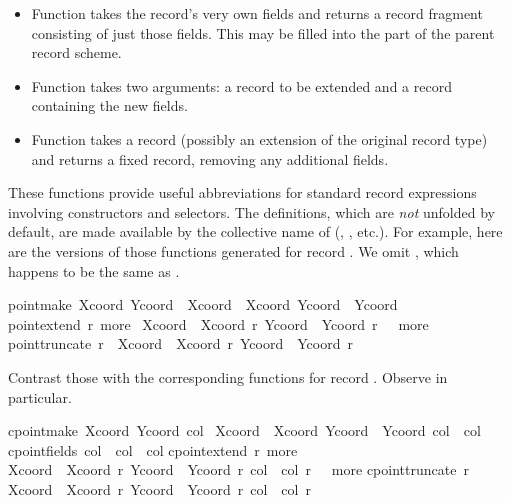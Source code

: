 \begin{isabellebody}
\begin{isamarkuptext}
\begin{itemize}
  \item Function  takes the record's very own fields and
  returns a record fragment consisting of just those fields.  This may
  be filled into the  part of the parent record scheme.

  \item Function  takes two arguments: a record to be
  extended and a record containing the new fields.

  \item Function  takes a record (possibly an extension
  of the original record type) and returns a fixed record, removing
  any additional fields.

  \end{itemize}
  These functions provide useful abbreviations for standard
  record expressions involving constructors and selectors.  The
  definitions, which are \emph{not} unfolded by default, are made
  available by the collective name of  (, , etc.).
  For example, here are the versions of those functions generated for
  record .  We omit , which happens to
  be the same as .

  \begin{isabelle}%
point{\isachardot}make\ Xcoord\ Ycoord\ {\isasymequiv}\ {\isasymlparr}Xcoord\ {\isacharequal}\ Xcoord{\isacharcomma}\ Ycoord\ {\isacharequal}\ Ycoord{\isasymrparr}\isasep\isanewline%
point{\isachardot}extend\ r\ more\ {\isasymequiv}\isanewline
{\isasymlparr}Xcoord\ {\isacharequal}\ Xcoord\ r{\isacharcomma}\ Ycoord\ {\isacharequal}\ Ycoord\ r{\isacharcomma}\ {\isasymdots}\ {\isacharequal}\ more{\isasymrparr}\isasep\isanewline%
point{\isachardot}truncate\ r\ {\isasymequiv}\ {\isasymlparr}Xcoord\ {\isacharequal}\ Xcoord\ r{\isacharcomma}\ Ycoord\ {\isacharequal}\ Ycoord\ r{\isasymrparr}%
\end{isabelle}
  Contrast those with the corresponding functions for record .  Observe  in particular.
  \begin{isabelle}%
cpoint{\isachardot}make\ Xcoord\ Ycoord\ col\ {\isasymequiv}\isanewline
{\isasymlparr}Xcoord\ {\isacharequal}\ Xcoord{\isacharcomma}\ Ycoord\ {\isacharequal}\ Ycoord{\isacharcomma}\ col\ {\isacharequal}\ col{\isasymrparr}\isasep\isanewline%
cpoint{\isachardot}fields\ col\ {\isasymequiv}\ {\isasymlparr}col\ {\isacharequal}\ col{\isasymrparr}\isasep\isanewline%
cpoint{\isachardot}extend\ r\ more\ {\isasymequiv}\isanewline
{\isasymlparr}Xcoord\ {\isacharequal}\ Xcoord\ r{\isacharcomma}\ Ycoord\ {\isacharequal}\ Ycoord\ r{\isacharcomma}\ col\ {\isacharequal}\ col\ r{\isacharcomma}\ {\isasymdots}\ {\isacharequal}\ more{\isasymrparr}\isasep\isanewline%
cpoint{\isachardot}truncate\ r\ {\isasymequiv}\isanewline
{\isasymlparr}Xcoord\ {\isacharequal}\ Xcoord\ r{\isacharcomma}\ Ycoord\ {\isacharequal}\ Ycoord\ r{\isacharcomma}\ col\ {\isacharequal}\ col\ r{\isasymrparr}%
\end{isabelle}


\end{isamarkuptext}
\end{isabellebody}
